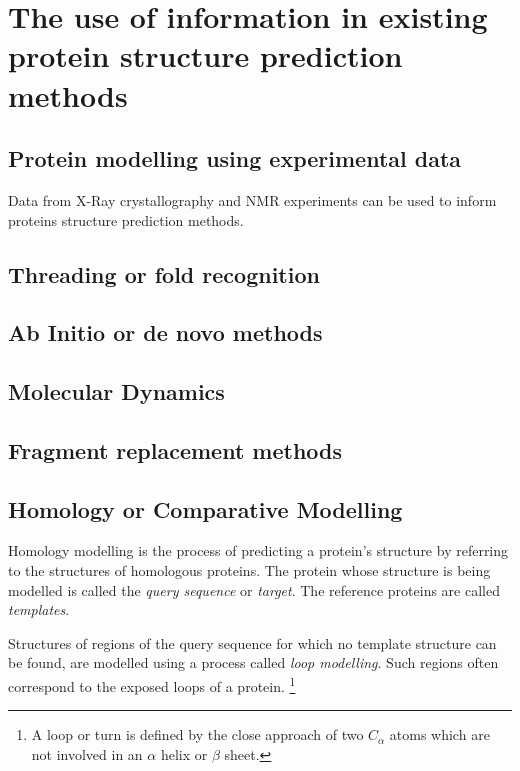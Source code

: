 \documentclass[10pt]{report}
\begin{document}
\chapter{The use of information in existing protein structure prediction methods}

\section{Protein modelling using experimental data}

Data from X-Ray crystallography and NMR experiments can be used to inform proteins structure prediction methods.

\section{Threading or fold recognition}

\section{Ab Initio or de novo methods}

\section{Molecular Dynamics}

\section{Fragment replacement methods}



\section{Homology or Comparative Modelling}

Homology modelling is the process of predicting a protein's structure by referring to the structures of homologous proteins. The protein whose structure is being modelled is called the \textit{query sequence} or \textit{target}. The reference proteins are called \textit{templates}.

Structures of regions of the query sequence for which no template structure can be found, are modelled using a process called \textit{loop modelling}. Such regions often correspond to the exposed loops of a protein. \footnote{A loop or turn is defined by the close approach of two $C_{\alpha}$ atoms which are not involved in an $\alpha$ helix or $\beta$ sheet.} 
\end{document}

